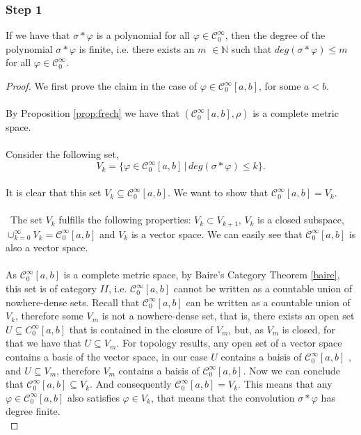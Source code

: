 \documentclass[../main.tex]{subfiles}
\begin{document}
	\subsubsection{Step 1}
	\begin{lema}  %
		If we have that $\sigma \ast \varphi $ is a polynomial for all $\varphi \in \mathcal{C}^\infty_0 $, then the degree of the polynomial $\sigma \ast \varphi $ is finite, i.e. there exists an $m$ $\in \mathbb{N}$ such that $ deg (\sigma \ast \varphi) \leq m$ for all $\varphi \in \mathcal{C}^\infty_0$. 
	\end{lema}
	\begin{proof}
		We first prove the claim in the case of $\varphi \in \mathcal{C}^\infty_0[a,b]$, for some $a<b$. \\ \\ By Proposition \ref{prop:frech} we have that $(\mathcal{C}^\infty_0[a,b],\rho)$ is a complete metric space.  \\ \\  Consider the following set, \\ $$V_k= \{\varphi \in \mathcal{C}_0^\infty[a,b] \, | \,  deg(\sigma \ast \varphi ) \leq k\}.$$ \\
		It is clear that this set $V_k\subseteq \mathcal{C}_0^\infty[a,b]. $ 
		We want to show that $\mathcal{C}_0^\infty[a,b] = V_k.$ \\ \\  The set $ V_k$ fulfills the following properties: $V_k \subset V_{k+1}$, $V_k $ is a closed subspace, $\cup_{k=0}^\infty V_k = \mathcal{C}_0^\infty[a,b]$ and $V_k$ is a vector space. We can easily see that $\mathcal{C}_0^\infty[a,b]$ is also a vector space.\\ \\ 
	\noindent As $\mathcal{C}_0^\infty[a,b]$ is a complete metric space, by Baire's Category Theorem \ref{baire}, this set is of category $II$, i.e. $\mathcal{C}_0^\infty[a,b]$  cannot be written as a countable union of nowhere-dense sets. Recall that $\mathcal{C}_0^\infty[a,b]$ can be written as a countable union of $V_k$, therefore some $V_m $ is not a nowhere-dense set, that is, there exists an open set $U\subseteq C_0^\infty[a,b]$ that is contained in the closure of $V_m$, but, as $V_m$ is closed, for that we have that $U\subseteq V_m$. For topology results, any open set of a vector space contains a basis of the vector space, in our case $U$ contains a baisis of $\mathcal{C}_0^\infty[a,b]$ , and $U\subseteq V_m$, therefore $V_m$ contains a baisis of $\mathcal{C}_0^\infty[a,b]$. Now we can conclude that $\mathcal{C}_0^\infty[a,b] \subseteq V_k.$ And consequently $\mathcal{C}_0^\infty[a,b] = V_k.$ This means that any $\varphi \in \mathcal{C}^\infty_0[a,b] $ also satisfies $ \varphi \in V_k$,  that means that the convolution $\sigma \ast \varphi $ has degree finite. \\ 
		

\end{proof}
\end{document}
